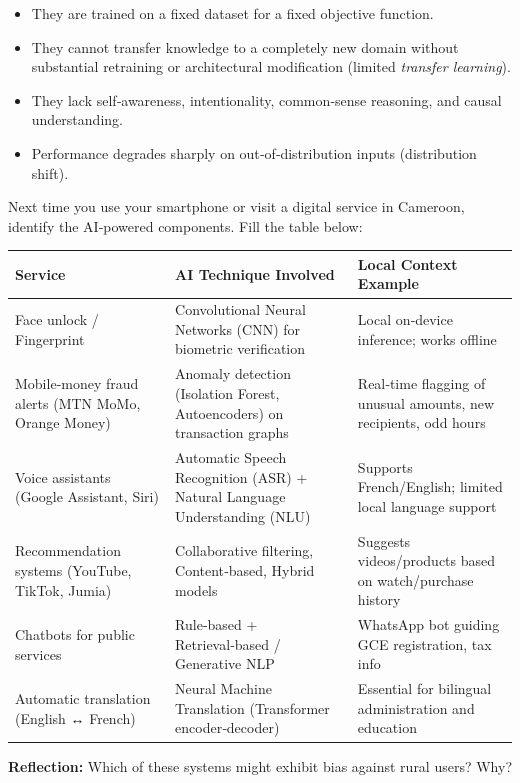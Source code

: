 \documentclass[11pt]{article}
\newcounter{popsec}
\newcounter{popsub}
\newcommand{\courssub}[1]{%
  \stepcounter{popsub}%
  \par\vspace{9pt}\noindent{\popxbold\fontsize{11.5}{13}\selectfont\color{popink}{\color{poporange}\thepopsec.\thepopsub}\hspace{6pt}#1}\par\nopagebreak\vspace{4pt}
}
\begin{document}
\begin{aretenir}
\begin{itemize}
\item They are trained on a fixed dataset for a fixed objective function.
\item They cannot transfer knowledge to a completely new domain without substantial retraining or architectural modification (limited \emph{transfer learning}).
\item They lack self‑awareness, intentionality, common‑sense reasoning, and causal understanding.
\item Performance degrades sharply on out‑of‑distribution inputs (distribution shift).
\end{itemize}
\end{aretenir}

\courssub{AI in Cameroon: Everyday Examples}

\begin{experience}
Next time you use your smartphone or visit a digital service in Cameroon, identify the AI‑powered components. Fill the table below:

\begin{center}
\begin{tabularx}{\linewidth}{|l|X|X|}
\hline
\rowcolor{popblueL}
\textbf{Service} & \textbf{AI Technique Involved} & \textbf{Local Context Example} \\
\hline
Face unlock / Fingerprint & Convolutional Neural Networks (CNN) for biometric verification & Local on‑device inference; works offline \\
\hline
Mobile‑money fraud alerts (MTN MoMo, Orange Money) & Anomaly detection (Isolation Forest, Autoencoders) on transaction graphs & Real‑time flagging of unusual amounts, new recipients, odd hours \\
\hline
Voice assistants (Google Assistant, Siri) & Automatic Speech Recognition (ASR) + Natural Language Understanding (NLU) & Supports French/English; limited local language support \\
\hline
Recommendation systems (YouTube, TikTok, Jumia) & Collaborative filtering, Content‑based, Hybrid models & Suggests videos/products based on watch/purchase history \\
\hline
Chatbots for public services & Rule‑based + Retrieval‑based / Generative NLP & WhatsApp bot guiding GCE registration, tax info \\
\hline
Automatic translation (English ↔ French) & Neural Machine Translation (Transformer encoder‑decoder) & Essential for bilingual administration and education \\
\hline
\end{tabularx}
\end{center}
\textbf{Reflection:} Which of these systems might exhibit bias against rural users? Why?
\end{experience}
\end{document}
